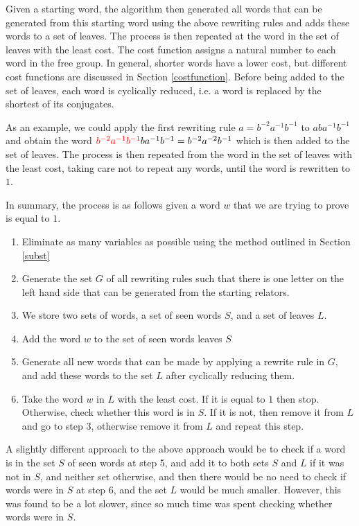 \documentclass[12pt]{article} %
\theoremstyle{definition}
\theoremstyle{definition}
\theoremstyle{definition}
\theoremstyle{definition}
\begin{document}
  Given a starting word, the algorithm then generated all words that can be generated
  from this starting word using the above rewriting rules and adds these
  words to a set of leaves. The process is then repeated at the word in the set of
  leaves with the least cost. The cost function assigns a natural number to each word in
  the free group. In general, shorter words have a lower cost, but different cost functions
  are discussed in Section \ref{costfunction}. Before being added to the set of leaves,
  each word is cyclically
  reduced, i.e. a word is replaced by the shortest of its conjugates.

  As an example, we could apply the first rewriting rule $a = b^{-2}a^{-1}b^{-1}$
  to $aba^{-1}b^{-1}$ and obtain the word
  $\color{red}b^{-2}a^{-1}b^{-1}\color{black}ba^{-1}b^{-1} =
  b^{-2}a^{-2}b^{-1}$ which is then added to the set of leaves. The process
  is then repeated from the word in the set of leaves with the least cost, taking care
  not to repeat any words, until the word is rewritten to $1$.

  In summary, the process is as follows given a word $w$ that we are trying to prove is equal
  to $1$.
  \begin{enumerate}
    \item Eliminate as many variables as possible using the method outlined in Section \ref{subst}
    \item Generate the set $G$ of all rewriting rules such that there is one letter on the
      left hand side that can be generated from the starting relators.
    \item We store two sets of words, a set of seen words $S$, and a set of leaves $L$.
    \item Add the word $w$ to the set of seen words leaves $S$
    \item Generate all new words that can be made by applying a rewrite rule in $G$,
      and add these words to the set $L$ after cyclically reducing them.
    \item Take the word $w$ in $L$ with the least cost.
      If it is equal to $1$ then stop. Otherwise, check whether this
      word is in $S$. If it is not, then remove
      it from $L$ and go to step 3, otherwise remove it from $L$ and repeat this step.
  \end{enumerate}

A slightly different approach to the above approach would be to check if
a word is in the set $S$ of seen words at step 5, and add it to both sets $S$ and $L$
if it was not in $S$, and neither set otherwise, and then there would be no need to check
if words were in $S$ at step 6, and the set $L$ would be much smaller. However, this was
found to be a lot slower, since so much time was spent checking whether words were in $S$.
\end{document}
